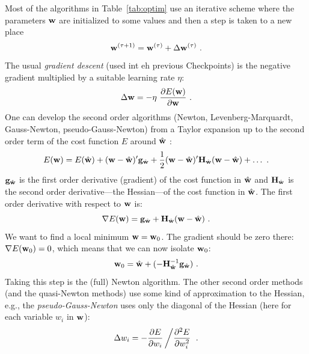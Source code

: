 \documentclass[12pt]{article}
\begin{document}
%
Most of the algorithms in Table~\ref{tab:optim} use an iterative
scheme where the parameters ${\bf w}$ are initialized to some
values and then a step is taken to a new place
\begin{equation}
  \label{eq:step}
  {\bf w}^{(\tau+1)} = {\bf w}^{(\tau)} + \Delta {\bf w}^{(\tau)} \ .
\end{equation}
The usual {\em gradient descent} (used int eh previous Checkpoints) is the
negative gradient multiplied by a suitable learning rate $\eta$:
\begin{equation}
  \label{eq:backprob}
  \Delta {\bf w} = - \eta\ \frac{\partial E({\bf w})}{\partial {\bf w}} \ .
\end{equation}
One can develop the second order algorithms (Newton,
Levenberg-Marquardt, Gauss-Newton, pseudo-Gauss-Newton) from a
Taylor expansion up to the second order term of the cost function $E$
around $\hat{\bf w}$ :
\begin{equation}
  \label{eq:taylor}
  E({\bf w}) = E(\hat{\bf w}) + ({\bf w} - \hat{\bf w})' {\bf
    g}_{\hat{\bf w}} +
  \frac{1}{2} ({\bf w} - \hat{\bf w})' {\bf H}_{\hat{\bf w}} ({\bf w}
    - \hat{\bf w})
    + \ldots \ .
\end{equation}
${\bf g}_{\hat{\bf w}}$ is the first order derivative (gradient)
of the cost function in $\hat{\bf w}$ and ${\bf H}_{\hat{\bf w}}$
is the second order derivative---the Hessian---of the
cost function in $\hat{\bf w}$. The first order derivative with respect to
${\bf w}$ is:
\begin{equation}
  \label{eq:derivative}
  \nabla E({\bf w}) = {\bf g}_{\hat{\bf w}} + {\bf H}_{\hat{\bf
  w}} ({\bf w} - \hat{\bf w}) \ .
\end{equation}
We want to find a local minimum ${\bf w} = {\bf w}_0$. The
gradient should be zero there: $\nabla E ({\bf w}_0) = 0$, which
means that we can now isolate ${\bf w}_0$:
\begin{equation}
  \label{eq:zero}
  {\bf w}_0 = \hat{\bf w} + (- {\bf H}^{-1}_{\hat{\bf w}} {\bf
  g}_{\hat{\bf w}}) \ .
\end{equation}
Taking this step is the (full) Newton algorithm. The other second
order methods (and the quasi-Newton methods) use some kind of
approximation to the Hessian, e.g., the {\em pseudo-Gauss-Newton}
uses only the diagonal of the Hessian (here for each variable
$w_i$ in ${\bf w}$):
\begin{equation}
  \label{eq:pseudogn}
  \Delta w_i = - \frac{\partial E}{\partial w_i} \left/
  \frac{\partial^2 E}{\partial w_i^2} \right. \ .
\end{equation}
\end{document}
